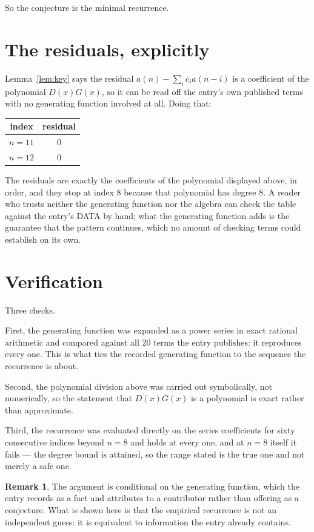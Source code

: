 \documentclass[11pt,a4paper]{article}
\theoremstyle{plain}
\theoremstyle{definition}
\newtheorem{remark}[theorem]{Remark}
\begin{document}
So the conjecture is the minimal recurrence.

\section{The residuals, explicitly}

Lemma~\ref{lem:key} says the residual $a(n)-\sum_ic_ia(n-i)$ is a coefficient of the
polynomial $D(x)G(x)$, so it can be read off the entry's own published terms with no
generating function involved at all. Doing that:
\begin{center}
\begin{tabular}{cc}
index & residual \\ \hline
$n=11$ & $0$ \\
$n=12$ & $0$
\end{tabular}
\end{center}
The residuals are exactly the coefficients of the polynomial displayed above, in order, and
they stop at index $8$ because that polynomial has degree $8$. A reader who trusts
neither the generating function nor the algebra can check the table against the entry's DATA
by hand; what the generating function adds is the guarantee that the pattern continues, which
no amount of checking terms could establish on its own.

\section{Verification}

Three checks.

First, the generating function was expanded as a power series in exact rational arithmetic and
compared against all $20$ terms the entry publishes: it reproduces every one. This is
what ties the recorded generating function to the sequence the recurrence is about.

Second, the polynomial division above was carried out symbolically, not numerically, so the
statement that $D(x)G(x)$ is a polynomial is exact rather than approximate.

Third, the recurrence was evaluated directly on the series coefficients for sixty consecutive
indices beyond $n=8$ and holds at every one, and at $n=8$ itself it fails --- the
degree bound is attained, so the range stated is the true one and not merely a safe one.

\begin{remark}
The argument is conditional on the generating function, which the entry records as a fact and
attributes to a contributor rather than offering as a conjecture. What is shown here is that
the empirical recurrence is not an independent guess: it is equivalent to information the
entry already contains.
\end{remark}
\end{document}
